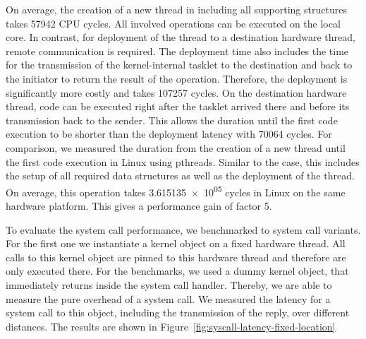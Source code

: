 On average, the creation of a new thread in \mythos including all supporting
structures takes \num{57942} CPU cycles. All involved operations can be executed
on the local core. In contrast, for deployment of the thread to a destination
hardware thread, remote communication is required. The deployment time also
includes the time for the transmission of the kernel-internal tasklet to the
destination and back to the initiator to return the result of the operation.
Therefore, the deployment is significantly more costly and takes \num{107257}
cycles.
On the destination hardware thread, code can be executed right after the tasklet
arrived there and before its transmission back to the sender. This allows the
duration until the first code execution to be shorter than the deployment
latency with \num{70064} cycles.
For comparison, we measured the duration from the creation of a new thread until
the first code execution in Linux using pthreads. Similar to the \mythos case,
this includes the setup of all required data structures as well as the
deployment of the thread. On average, this operation takes \num{3.615135e+05}
cycles in Linux on the same hardware platform. This gives \mythos a performance
gain of factor \num{5}.

To evaluate the system call performance, we benchmarked to system call variants. For the first one we instantiate a kernel object on a fixed hardware thread. All calls to this kernel object are pinned to this hardware thread and therefore are only executed there. For the benchmarks, we used a dummy kernel object, that immediately returns inside the system call handler. Thereby, we are able to measure the pure overhead of a system call. We measured the latency for a system call to this object, including the transmission of the reply, over different distances. The results are shown in Figure~\ref{fig:syscall-latency-fixed-location}

